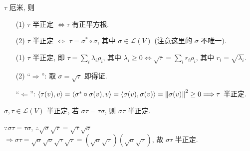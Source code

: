 \documentclass{note}
\begin{document}
\begin{thm}
    $\tau$ 厄米, 则
    \begin{itemize}
        \item[(1)] $\tau$ 半正定 $\Longleftrightarrow\tau$ 有正平方根.
        \item[(2)] $\tau$ 半正定 $\Longleftrightarrow$ $\tau=\sigma^*\circ\sigma$, 其中 $\sigma\in\mathcal{L}(V)$ (注意这里的 $\sigma$ 不唯一).
    \end{itemize}
\end{thm}
\begin{pf}
    \begin{itemize}
        \item[(1)] $\tau$ 半正定, 即 $\tau=\sum_i\lambda_i\rho_i$, 其中 $\lambda_i\geq 0\Longleftrightarrow\sqrt{\tau}=\sum_ir_i\rho_i$, 其中 $r_i=\sqrt{\lambda_i}$.
        \item[(2)] ``$\Longrightarrow$'': 取 $\sigma=\sqrt{\tau}$ 即得证.

        ``$\Longleftarrow$'': $\langle\tau(v),v\rangle=\langle\sigma^*\circ\sigma(v),v\rangle=\langle\sigma(v),\sigma(v)\rangle=\left\lVert\sigma(v)\right\rVert^2\geq 0\Longrightarrow\tau$ 半正定.
    \end{itemize}
\end{pf}

\begin{thm}
    $\sigma,\tau\in\mathcal{L}(V)$ 半正定, 若 $\sigma\tau=\tau\sigma$, 则 $\sigma\tau$ 半正定.
\end{thm}
\begin{pf}
    $\because\sigma\tau=\tau\sigma$, $\therefore\sqrt{\sigma}\sqrt{\tau}=\sqrt{\tau}\sqrt{\sigma}$\\
    $\Longrightarrow\sigma\tau=\sqrt{\sigma}\sqrt{\sigma}\sqrt{\tau}\sqrt{\tau}=(\sqrt{\sigma}\sqrt{\tau})(\sqrt{\sigma}\sqrt{\tau})$, 故 $\sigma\tau$ 半正定.
\end{pf}
\end{document}
